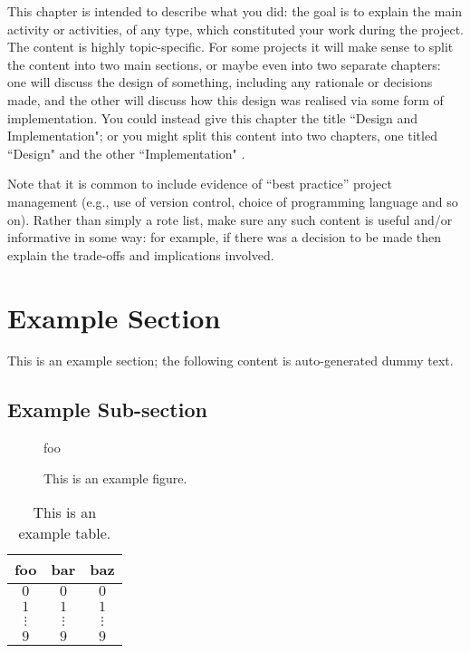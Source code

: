 \documentclass[ %
                    author={Daniel Page},
                supervisor={Dr. Andrew Calway},
                    degree={MSc},
                     title={Some Structural Guidelines for Data Science MSc Theses, Including Those With Long Titles that Run Across Multiple Lines on the Front Page},
                  subtitle={And those including an optional subtitle too, for good measure},
                      type={},
                      year={2021}]{dissertation}
\begin{document}
\noindent
This chapter is intended to describe what you did: the goal is to explain
the main activity or activities, of any type, which constituted your work 
during the project.  The content is highly topic-specific. For some 
projects it will make sense to split the content into two main sections, or maybe even into two separate chapters: one 
will discuss the design of something, including any rationale or decisions made, 
and the other will discuss how this design was realised via some form of 
implementation.  You could instead give this chapter the title ``Design and Implementation"; or you might split this content into two chapters, one titled ``Design" and the other ``Implementation" .

Note that it is common to include evidence of ``best practice'' project 
management (e.g., use of version control, choice of programming language 
and so on).  Rather than simply a rote list, make sure any such content 
is useful and/or informative in some way: for example, if there was a 
decision to be made then explain the trade-offs and implications 
involved.

\section{Example Section}

This is an example section; 
the following content is auto-generated dummy text.
\lipsum

\subsection{Example Sub-section}

\begin{figure}[t]
\centering
foo
\caption{This is an example figure.}
\label{fig}
\end{figure}

\begin{table}[t]
\centering
\begin{tabular}{|cc|c|}
\hline
foo      & bar      & baz      \\
\hline
$0     $ & $0     $ & $0     $ \\
$1     $ & $1     $ & $1     $ \\
$\vdots$ & $\vdots$ & $\vdots$ \\
$9     $ & $9     $ & $9     $ \\
\hline
\end{tabular}
\caption{This is an example table.}
\label{tab}
\end{table}
\end{document}
